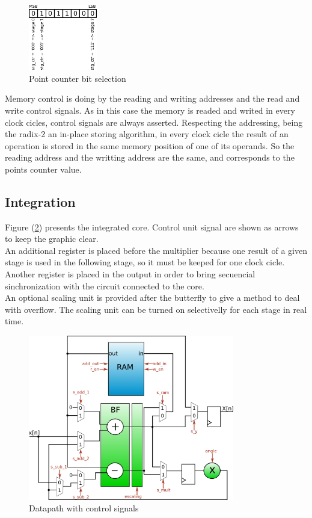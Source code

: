 \documentclass[conference]{IEEEtran}
\begin{document}
\begin{figure}[htb!]
        \centering
        \includegraphics[width=3cm]{./figures/r2conts.png}
        \caption{Point counter bit selection}
        \label{fig:r2conts}
\end{figure} 

Memory control is doing by the reading and writing addresses and the read and write control signals. As in this case the memory is readed 
and writed in every clock cicles, control signals are always asserted. Respecting the addressing, being the radix-2 an in-place storing
algorithm, in every clock cicle the result of an operation is stored in the same memory position of one of its operands. So the reading 
address and the writting address are the same, and corresponds to the points counter value.

\subsection{Integration}

Figure (\ref{fig:datapathmem}) presents the integrated core. Control unit signal are shown as arrows to keep the graphic clear.\\
An additional register is placed before the multiplier because one result of a given stage is used in the following stage, so
it must be keeped for one clock cicle. Another register is placed in the output in order to bring secuencial sinchronization 
with the circuit connected to the core.\\
An optional scaling unit is provided after the butterfly to give a method to deal with overflow. The scaling unit can be turned on 
selectivelly for each stage in real time. 

\begin{figure}[htb!]
        \centering
        \includegraphics[width=9cm]{./figures/datapathMem.png}
        \caption{Datapath with control signals}
        \label{fig:datapathmem}
\end{figure}
 
\end{document}
